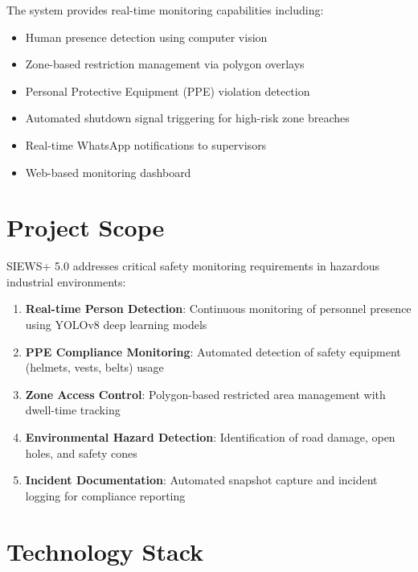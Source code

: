 \documentclass[12pt,a4paper,oneside]{book}
\begin{document}
The system provides real-time monitoring capabilities including:
\begin{itemize}
    \item Human presence detection using computer vision
    \item Zone-based restriction management via polygon overlays
    \item Personal Protective Equipment (PPE) violation detection
    \item Automated shutdown signal triggering for high-risk zone breaches
    \item Real-time WhatsApp notifications to supervisors
    \item Web-based monitoring dashboard
\end{itemize}

\section{Project Scope}

SIEWS+ 5.0 addresses critical safety monitoring requirements in hazardous industrial environments:

\begin{enumerate}
    \item \textbf{Real-time Person Detection}: Continuous monitoring of personnel presence using YOLOv8 deep learning models
    \item \textbf{PPE Compliance Monitoring}: Automated detection of safety equipment (helmets, vests, belts) usage
    \item \textbf{Zone Access Control}: Polygon-based restricted area management with dwell-time tracking
    \item \textbf{Environmental Hazard Detection}: Identification of road damage, open holes, and safety cones
    \item \textbf{Incident Documentation}: Automated snapshot capture and incident logging for compliance reporting
\end{enumerate}

\section{Technology Stack}
\end{document}
